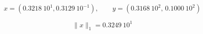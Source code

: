\[ x=(0.3218\ 10^1, 0.3129\ 10^{-1}), \quad \quad  y=(0.3168\ 10^2, \, 0.1000\ 10^{2}) \]

\medskip
\[ \|x\|_1= 0.3249\ 10^1 \]
